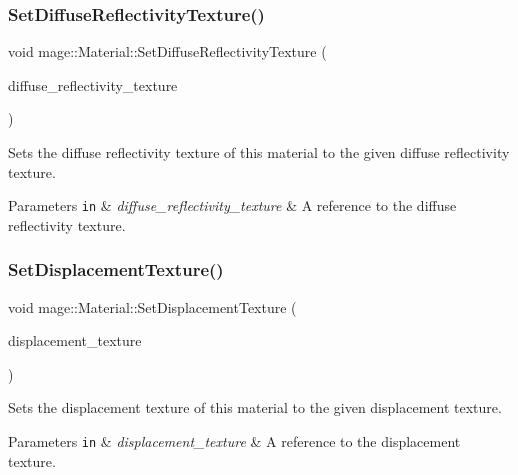 \subsubsection{\texorpdfstring{Set\+Diffuse\+Reflectivity\+Texture()}{SetDiffuseReflectivityTexture()}}
{\footnotesize\ttfamily void mage\+::\+Material\+::\+Set\+Diffuse\+Reflectivity\+Texture (\begin{DoxyParamCaption}\item[{\hyperlink{namespacemage_a1e01ae66713838a7a67d30e44c67703e}{Shared\+Ptr}$<$ \hyperlink{classmage_1_1_texture}{Texture} $>$}]{diffuse\+\_\+reflectivity\+\_\+texture }\end{DoxyParamCaption})}

Sets the diffuse reflectivity texture of this material to the given diffuse reflectivity texture.


\begin{DoxyParams}[1]{Parameters}
\mbox{\tt in}  & {\em diffuse\+\_\+reflectivity\+\_\+texture} & A reference to the diffuse reflectivity texture. \\
\hline
\end{DoxyParams}
\hypertarget{structmage_1_1_material_ab9c90afa999906a3ad33c8a8da13da24}{}\label{structmage_1_1_material_ab9c90afa999906a3ad33c8a8da13da24} 
\subsubsection{\texorpdfstring{Set\+Displacement\+Texture()}{SetDisplacementTexture()}}
{\footnotesize\ttfamily void mage\+::\+Material\+::\+Set\+Displacement\+Texture (\begin{DoxyParamCaption}\item[{\hyperlink{namespacemage_a1e01ae66713838a7a67d30e44c67703e}{Shared\+Ptr}$<$ \hyperlink{classmage_1_1_texture}{Texture} $>$}]{displacement\+\_\+texture }\end{DoxyParamCaption})}

Sets the displacement texture of this material to the given displacement texture.


\begin{DoxyParams}[1]{Parameters}
\mbox{\tt in}  & {\em displacement\+\_\+texture} & A reference to the displacement texture. \\
\hline
\end{DoxyParams}
\hypertarget{structmage_1_1_material_ad86de160f4e4e03c24329d8f9415ccaa}{}\label{structmage_1_1_material_ad86de160f4e4e03c24329d8f9415ccaa} 
